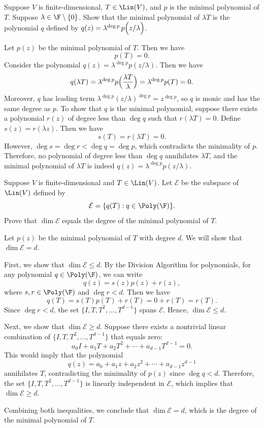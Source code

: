 \begin{exercise}
Suppose $V$ is finite-dimensional, $T\in\Lin(V)$, and $p$ is the minimal
polynomial of $T$. Suppose $\lambda\in\F\setminus\{0\}$. Show that the minimal
polynomial of $\lambda T$ is the polynomial $q$ defined by
$q(z)=\lambda^{\deg p}\,p\Bigl(z/\lambda\Bigr)$.
\end{exercise}
\begin{solution}
Let $p(z)$ be the minimal polynomial of $T$. Then we have
\[ p(T)=0. \]
Consider the polynomial $q(z)=\lambda^{\deg p}p(z/\lambda)$. Then we
have
\[ q(\lambda T)=\lambda^{\deg p}p\Bigl(\frac{\lambda T}{\lambda}\Bigr)
   =\lambda^{\deg p}p(T)=0. \]
Moreover, $q$ has leading term
$\lambda^{\deg p}(z/\lambda)^{\deg p}=z^{\deg p}$, so $q$ is monic and
has the same degree as $p$. To show that $q$ is the minimal polynomial,
suppose there exists a polynomial $r(z)$ of degree less than $\deg q$ such
that $r(\lambda T)=0$. Define $s(z)=r(\lambda z)$. Then we have
\[ s(T)=r(\lambda T)=0. \]
However, $\deg s=\deg r<\deg q=\deg p$, which contradicts the minimality of
$p$. Therefore, no polynomial of degree less than $\deg q$ annihilates
$\lambda T$, and the minimal polynomial of $\lambda T$ is indeed
$q(z)=\lambda^{\deg p}p(z/\lambda)$.
\end{solution}

\begin{exercise}
Suppose $V$ is finite-dimensional and $T\in\Lin(V)$. Let $\mathcal{E}$ be the
subspace of $\Lin(V)$ defined by
\[ \mathcal{E}=\{q(T) : q\in\Poly(\F)\}. \]
Prove that $\dim\mathcal{E}$ equals the degree of the minimal polynomial of
$T$.
\end{exercise}
\begin{solution}
Let $p(z)$ be the minimal polynomial of $T$ with degree $d$. We will show that
$\dim\mathcal{E}=d$.

First, we show that $\dim\mathcal{E}\le d$. By the Division Algorithm for
polynomials, for any polynomial $q\in\Poly(\F)$, we can write
\[ q(z)=s(z)p(z)+r(z), \]
where $s,r\in\Poly(\F)$ and $\deg r<d$. Then we have
\[ q(T)=s(T)p(T)+r(T)=0+r(T)=r(T). \]
Since $\deg r<d$, the set $\{I,T,T^2,\dots,T^{d-1}\}$ spans $\mathcal{E}$.
Hence, $\dim\mathcal{E}\le d$.

Next, we show that $\dim\mathcal{E}\ge d$. Suppose there exists a nontrivial
linear combination of $\{I,T,T^2,\dots,T^{d-1}\}$ that equals zero:
\[ a_0I+a_1T+a_2T^2+\cdots+a_{d-1}T^{d-1}=0. \]
This would imply that the polynomial
\[ q(z)=a_0+a_1z+a_2z^2+\cdots+a_{d-1}z^{d-1} \]
annihilates $T$, contradicting the minimality of $p(z)$ since $\deg q<d$.
Therefore, the set $\{I,T,T^2,\dots,T^{d-1}\}$ is linearly independent in
$\mathcal{E}$, which implies that $\dim\mathcal{E}\ge d$.

Combining both inequalities, we conclude that $\dim\mathcal{E}=d$, which is
the degree of the minimal polynomial of $T$.
\end{solution}

